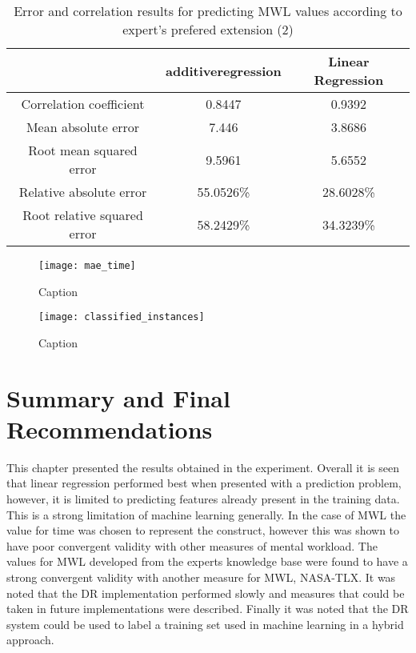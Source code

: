 \begin{table}[!htbp]
\centering
\begin{tabular}{|c|c|c|}
\hline
                            & additiveregression & Linear Regression\\ \hline
Correlation coefficient     & 0.8447    & 0.9392 \\
Mean absolute error         & 7.446      & 3.8686 \\
Root mean squared error     & 9.5961    & 5.6552  \\
Relative absolute error     & 55.0526\% & 28.6028\%\\
Root relative squared error & 58.2429\%  & 34.3239\%\\
\hline
\end{tabular}
\caption{Error and correlation results for predicting MWL values according to expert's prefered extension (2)}
\label{tab:mlhybrid2}
\end{table}


\begin{figure}
\centering
\texttt{[image: mae\_time]}
\caption{Caption}
\label{fig:my_label}
\end{figure}


\begin{figure}
\centering
\texttt{[image: classified\_instances]}
\caption{Caption}
\label{fig:my_label}
\end{figure}

\section{Summary and Final Recommendations}

This chapter presented the results obtained in the experiment. Overall it is seen that linear regression performed best when presented with a prediction problem, however, it is limited to predicting features already present in the training data. This is a strong limitation of machine learning generally. In the case of MWL the value for time was chosen to represent the construct, however this was shown to have poor convergent validity with other measures of mental workload. The values for MWL developed from the experts knowledge base were found to have a strong convergent validity with another measure for MWL, NASA-TLX. It was noted that the DR implementation performed slowly and measures that could be taken in future implementations were described. Finally it was noted that the DR system could be used to label a training set used in machine learning in a hybrid approach. 